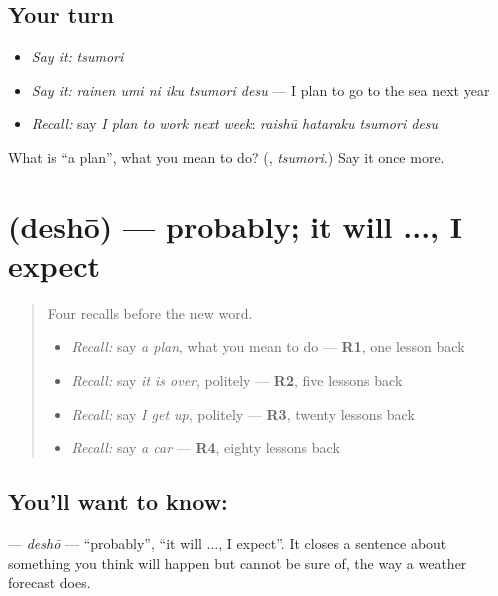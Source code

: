 \subsection*{Your turn}
\begin{itemize}
\raggedright
  \item \emph{Say it:} \emph{tsumori}
  \item \emph{Say it:} \emph{rainen umi ni iku tsumori desu} — I plan to go to the sea next year
  \item \emph{Recall:} say \emph{I plan to work next week}: \emph{raishū hataraku tsumori desu}
\end{itemize}

\begin{tcolorbox}[breakable,colback=teal!4,colframe=teal!35!black,title={Before you move on}]
What is \textquotedblleft{}a plan\textquotedblright{}, what you mean to do? (\textbf{}, \emph{tsumori}.) Say it once more.
\end{tcolorbox}
\section[\texorpdfstring{\ja{でしょう} (deshō)}{でしょう (deshō)}]{ (deshō) — probably; it will ..., I expect}

\label{lesson:JA-C141-deshou}



\begin{quote}
Four recalls before the new word.

\begin{itemize}
\raggedright
  \item \emph{Recall:} say \emph{a plan}, what you mean to do — \textbf{R1}, one lesson back
  \item \emph{Recall:} say \emph{it is over}, politely — \textbf{R2}, five lessons back
  \item \emph{Recall:} say \emph{I get up}, politely — \textbf{R3}, twenty lessons back
  \item \emph{Recall:} say \emph{a car} — \textbf{R4}, eighty lessons back
\end{itemize}
\end{quote}

\subsection*{You'll want to know: }
\textbf{} — \emph{deshō} — \textquotedblleft{}probably\textquotedblright{}, \textquotedblleft{}it will ..., I expect\textquotedblright{}. It closes a sentence about something you think will happen but cannot be sure of, the way a weather forecast does.

